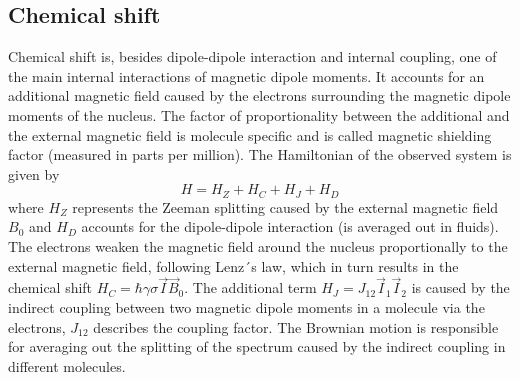 \subsection{Chemical shift}
Chemical shift is, besides dipole-dipole interaction and internal coupling, one of the main internal interactions of magnetic dipole moments. It accounts for an additional magnetic field caused by the electrons surrounding the magnetic dipole moments of the nucleus. The factor of proportionality between the additional and the external magnetic field is molecule specific and is called magnetic shielding factor (measured in parts per million). The Hamiltonian of the observed system is given by 
\begin{equation}
	H = H_Z + H_C + H_J + H_D
\end{equation}  
where $H_Z$ represents the Zeeman splitting caused by the external magnetic field $B_0$ and $H_D$ accounts for the dipole-dipole interaction (is averaged out in fluids). The electrons weaken the magnetic field around the nucleus proportionally to the external magnetic field, following Lenz´s law, which in turn results in the chemical shift $H_C = \hbar \gamma \sigma \vec{I}\vec{B}_0$. The additional term $H_J = J_{12} \vec{I}_1 \vec{I}_2$ is caused by the indirect coupling between two magnetic dipole moments in a molecule via the electrons, $J_{12} $ describes the coupling factor.
The Brownian motion is responsible for averaging out the splitting of the spectrum caused by the indirect coupling in different molecules.\cite{Hornak} \cite{IndirectCoupling}

